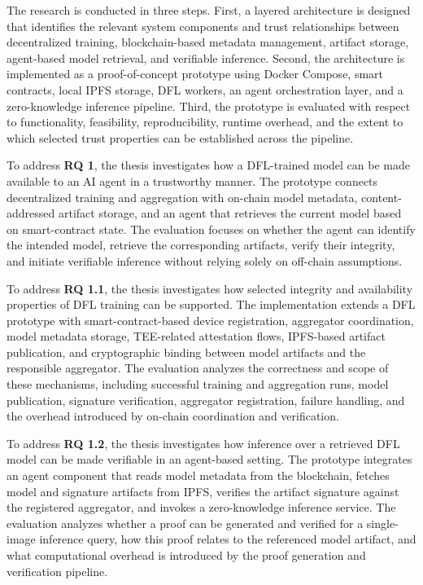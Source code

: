 The research is conducted in three steps. First, a layered architecture is designed that identifies the relevant system components and trust relationships between decentralized training, blockchain-based metadata management, artifact storage, agent-based model retrieval, and verifiable inference. Second, the architecture is implemented as a proof-of-concept prototype using Docker Compose, smart contracts, local \ac{IPFS} storage, \ac{DFL} workers, an agent orchestration layer, and a zero-knowledge inference pipeline. Third, the prototype is evaluated with respect to functionality, feasibility, reproducibility, runtime overhead, and the extent to which selected trust properties can be established across the pipeline.

To address \textbf{\ac{RQ} 1}, the thesis investigates how a \ac{DFL}-trained model can be made available to an \ac{AI} agent in a trustworthy manner. The prototype connects decentralized training and aggregation with on-chain model metadata, content-addressed artifact storage, and an agent that retrieves the current model based on smart-contract state. The evaluation focuses on whether the agent can identify the intended model, retrieve the corresponding artifacts, verify their integrity, and initiate verifiable inference without relying solely on off-chain assumptions.

To address \textbf{\ac{RQ} 1.1}, the thesis investigates how selected integrity and availability properties of \ac{DFL} training can be supported. The implementation extends a \ac{DFL} prototype with smart-contract-based device registration, aggregator coordination, model metadata storage, \ac{TEE}-related attestation flows, \ac{IPFS}-based artifact publication, and cryptographic binding between model artifacts and the responsible aggregator. The evaluation analyzes the correctness and scope of these mechanisms, including successful training and aggregation runs, model publication, signature verification, aggregator registration, failure handling, and the overhead introduced by on-chain coordination and verification.

To address \textbf{\ac{RQ} 1.2}, the thesis investigates how inference over a retrieved \ac{DFL} model can be made verifiable in an agent-based setting. The prototype integrates an agent component that reads model metadata from the blockchain, fetches model and signature artifacts from \ac{IPFS}, verifies the artifact signature against the registered aggregator, and invokes a zero-knowledge inference service. The evaluation analyzes whether a proof can be generated and verified for a single-image inference query, how this proof relates to the referenced model artifact, and what computational overhead is introduced by the proof generation and verification pipeline.

